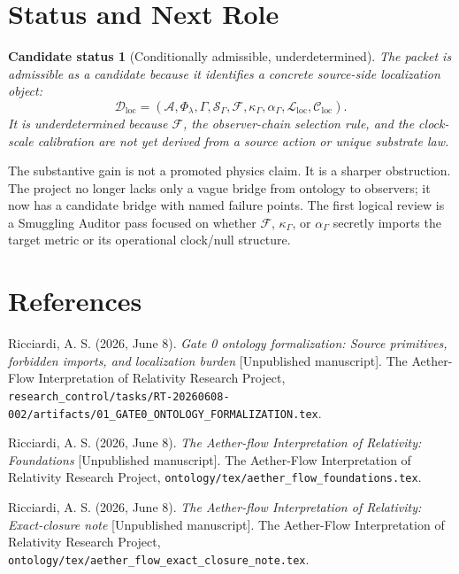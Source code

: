 \documentclass[11pt]{article}
\newcommand{\Sub}{\mathcal{A}}
\newcommand{\PhiFlow}{\Phi_{\lambda}}
\newcommand{\Data}{\mathcal{D}_{\mathrm{loc}}}
\newcommand{\Map}{\mathcal{L}_{\mathrm{loc}}}
\newcommand{\Constraints}{\mathcal{C}_{\mathrm{loc}}}
\newcommand{\Front}{\mathcal{F}}
\newcommand{\Order}{\mathcal{S}}
\newtheorem{verdict}{Candidate status}
\begin{document}
\section{Status and Next Role}

\begin{verdict}[Conditionally admissible, underdetermined]
The packet is admissible as a candidate because it identifies a concrete
source-side localization object:
\[
\Data
=
(\Sub,\PhiFlow,\Gamma,\Order_{\Gamma},\Front,\kappa_{\Gamma},
\alpha_{\Gamma},\Map,\Constraints).
\]
It is underdetermined because \(\Front\), the observer-chain selection rule, and
the clock-scale calibration are not yet derived from a source action or unique
substrate law.
\end{verdict}

The substantive gain is not a promoted physics claim. It is a sharper
obstruction. The project no longer lacks only a vague bridge from ontology to
observers; it now has a candidate bridge with named failure points. The first
logical review is a Smuggling Auditor pass focused on whether \(\Front\),
\(\kappa_{\Gamma}\), or \(\alpha_{\Gamma}\) secretly imports the target metric
or its operational clock/null structure.

\section*{References}

Ricciardi, A. S. (2026, June 8). \emph{Gate 0 ontology formalization: Source
primitives, forbidden imports, and localization burden} [Unpublished
manuscript]. The Aether-Flow Interpretation of Relativity Research Project,
\texttt{research\_control/tasks/RT-20260608-002/artifacts/01\_GATE0\_ONTOLOGY\_FORMALIZATION.tex}.

Ricciardi, A. S. (2026, June 8). \emph{The Aether-flow Interpretation of
Relativity: Foundations} [Unpublished manuscript]. The Aether-Flow
Interpretation of Relativity Research Project,
\texttt{ontology/tex/aether\_flow\_foundations.tex}.

Ricciardi, A. S. (2026, June 8). \emph{The Aether-flow Interpretation of
Relativity: Exact-closure note} [Unpublished manuscript]. The Aether-Flow
Interpretation of Relativity Research Project,
\texttt{ontology/tex/aether\_flow\_exact\_closure\_note.tex}.
\end{document}
